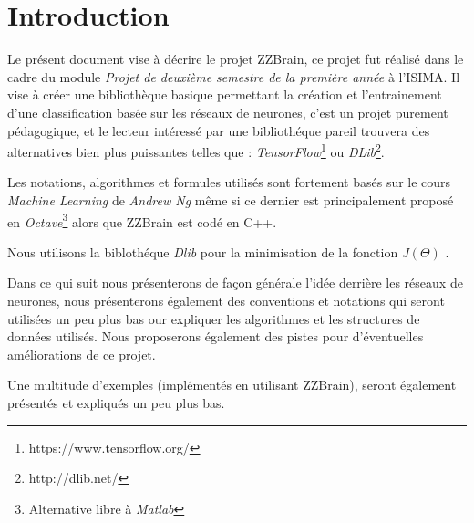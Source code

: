 \section{Introduction}

Le présent document vise à décrire le projet ZZBrain, ce projet fut réalisé dans le cadre du module \textit{Projet de deuxième semestre de la première année} à l'ISIMA. Il vise à créer une bibliothèque basique permettant la création et l'entrainement d'une classification basée sur les réseaux de neurones, c'est un projet purement pédagogique, et le lecteur intéressé par une bibliothéque pareil trouvera des alternatives bien plus puissantes telles que : \textit{TensorFlow}\footnote{https://www.tensorflow.org/} ou \textit{DLib}\footnote{http://dlib.net/}.


Les notations, algorithmes et formules utilisés sont fortement basés sur le cours \textit{Machine Learning} de \textit{Andrew Ng}\cite{machine-course} même si ce dernier est principalement proposé en \textit{Octave}\footnote{Alternative libre à \textit{Matlab}} alors que ZZBrain est codé en C++\cite{cpp}.


Nous utilisons la biblothéque \textit{Dlib}\cite{dlib} pour la minimisation de la fonction $J(\Theta)$ .


Dans ce qui suit nous présenterons de façon générale l'idée derrière les réseaux de neurones, nous présenterons également des conventions et notations qui seront utilisées un peu plus bas our expliquer les algorithmes et les structures de données utilisés.
Nous proposerons également des pistes pour d'éventuelles améliorations de ce projet.


Une multitude d'exemples (implémentés en utilisant ZZBrain), seront également présentés et expliqués un peu plus bas.

